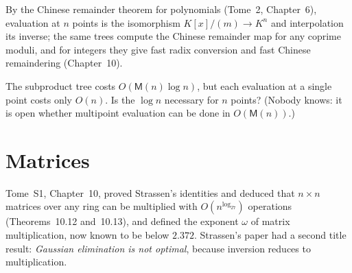 By the Chinese remainder theorem for polynomials (Tome~2, Chapter~6), evaluation at $n$ points is the isomorphism $K[x]/(m)\to K^n$ and interpolation its inverse; the same trees compute the Chinese remainder map for any coprime moduli, and for integers they give fast radix conversion and fast Chinese remaindering (Chapter~10).

\begin{think}
The subproduct tree costs $O(\mathsf M(n)\log n)$, but each evaluation at a single point costs only $O(n)$. Is the $\log n$ necessary for $n$ points? (Nobody knows: it is open whether multipoint evaluation can be done in $O(\mathsf M(n))$.)
\end{think}

\section{Matrices}\label{sec:matrices}

Tome~S1, Chapter~10, proved Strassen's identities and deduced that $n\times n$ matrices over any ring can be multiplied with $O(n^{\log_27})$ operations (Theorems~10.12 and~10.13), and defined the exponent $\omega$ of matrix multiplication, now known to be below $2.372$. Strassen's paper had a second title result: \emph{Gaussian elimination is not optimal}, because inversion reduces to multiplication.

